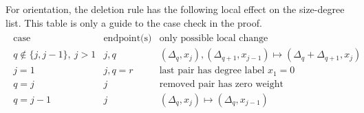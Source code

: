 \documentclass[10pt,a4paper]{article}
\begin{document}
For orientation, the deletion rule has the following local effect on the size-degree list.  This table is only a guide to the case check in the proof.
\begin{align*}
\begin{array}{c|c|c}
\text{case} & \text{endpoint(s) removed} & \text{only possible local change}\\ \hline
q\notin\{j,j-1\},\ j>1 & j,q &
(\Delta_q,x_j),(\Delta_{q+1},x_{j-1})\mapsto(\Delta_q+\Delta_{q+1},x_j)\\
j=1 & j,q=r & \text{last pair has degree label }x_1=0\\
q=j & j & \text{removed pair has zero weight}\\
q=j-1 & j & (\Delta_q,x_j)\mapsto(\Delta_q,x_{j-1})
\end{array}
\end{align*}
\end{document}
